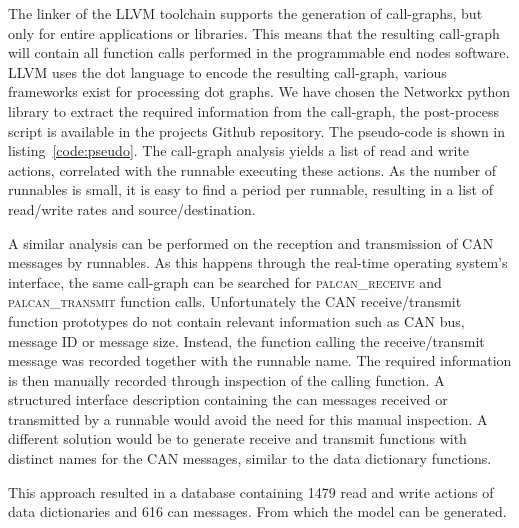 The linker of the LLVM toolchain supports the generation of call-graphs, but only for entire applications or libraries. This means that the resulting call-graph will contain all function calls performed in the programmable end nodes software. LLVM uses the dot language to encode the resulting call-graph, various frameworks exist for processing dot graphs. We have chosen the Networkx python library to extract the required information from the call-graph, the post-process script is available in the projects Github repository. The pseudo-code is shown in listing~\ref{code:pseudo}. The call-graph analysis yields a list of read and write actions, correlated with the runnable executing these actions. As the number of runnables is small, it is easy to find a period per runnable, resulting in a list of read/write rates and source/destination. 



A similar analysis can be performed on the reception and transmission of CAN messages by runnables. As this happens through the real-time operating system's interface, the same call-graph can be searched for \textsc{palcan\_receive} and \textsc{palcan\_transmit} function calls. Unfortunately the CAN receive/transmit function prototypes do not contain relevant information such as CAN bus, message ID or message size. Instead, the function calling the receive/transmit message was recorded together with the runnable name. The required information is then manually recorded through inspection of the calling function. A structured interface description containing the can messages received or transmitted by a runnable would avoid the need for this manual inspection. A different solution would be to generate receive and transmit functions with distinct names for the CAN messages, similar to the data dictionary functions.

This approach resulted in a database containing 1479 read and write actions of data dictionaries and 616 can messages. From which the \omnet model can be generated.